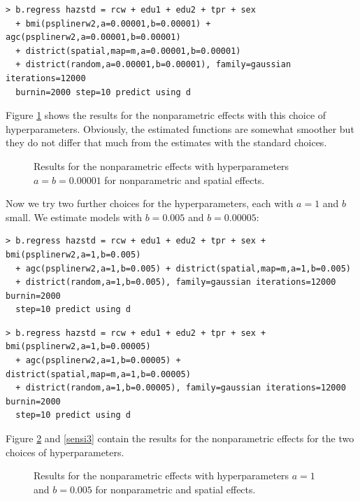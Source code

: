 \documentclass[a4paper]{article}
\begin{document}
\begin{verbatim}
> b.regress hazstd = rcw + edu1 + edu2 + tpr + sex
  + bmi(psplinerw2,a=0.00001,b=0.00001) + agc(psplinerw2,a=0.00001,b=0.00001)
  + district(spatial,map=m,a=0.00001,b=0.00001)
  + district(random,a=0.00001,b=0.00001), family=gaussian iterations=12000
  burnin=2000 step=10 predict using d
\end{verbatim}

Figure \ref{sensi1} shows the results for the nonparametric
effects with this choice of hyperparameters. Obviously, the
estimated functions are somewhat smoother but they do not differ
that much from the estimates with the standard choices.

\begin{figure}[ht]
\begin{center}
 {\it\caption{Results for
the nonparametric effects with hyperparameters $a=b=0.00001$ for
nonparametric and spatial effects.\label{sensi1}}}
\end{center}
\end{figure}

Now we try two further choices for the hyperparameters, each with
$a=1$ and $b$ small. We estimate models with $b=0.005$ and
$b=0.00005$:

\begin{verbatim}
> b.regress hazstd = rcw + edu1 + edu2 + tpr + sex + bmi(psplinerw2,a=1,b=0.005)
  + agc(psplinerw2,a=1,b=0.005) + district(spatial,map=m,a=1,b=0.005)
  + district(random,a=1,b=0.005), family=gaussian iterations=12000 burnin=2000
  step=10 predict using d
\end{verbatim}

\begin{verbatim}
> b.regress hazstd = rcw + edu1 + edu2 + tpr + sex + bmi(psplinerw2,a=1,b=0.00005)
  + agc(psplinerw2,a=1,b=0.00005) + district(spatial,map=m,a=1,b=0.00005)
  + district(random,a=1,b=0.00005), family=gaussian iterations=12000 burnin=2000
  step=10 predict using d
\end{verbatim}

Figure \ref{sensi2} and \ref{sensi3} contain the results for the
nonparametric effects for the two choices of hyperparameters.

\begin{figure}[ht]
\begin{center}
 {\it\caption{Results for
the nonparametric effects with hyperparameters $a=1$ and $b=0.005$
for nonparametric and spatial effects.\label{sensi2}}}
\end{center}
\end{figure}
\end{document}
